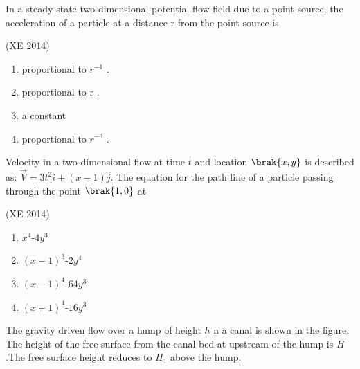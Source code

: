 \item In a steady state two-dimensional potential flow field due to a point source, the acceleration of a
particle at a distance r from the point source is

\hfill{(XE 2014)}
\begin{multicols}{4}
\begin{enumerate}

\item proportional to $r^{-1}$ .
\item proportional to r .
\item a constant
\item proportional to $r^{-3}$ .

\end{enumerate}
\end{multicols}


\item Velocity in a two-dimensional flow at time $t$ and location $\brak{x,y}$ is described as:
$\vec{V}=3t^{2}\hat{i}+(x-1)\hat{j}$. The equation for the path line of a particle passing through the point $\brak{1,0}$ at

\hfill{(XE 2014)}
\begin{multicols}{4}
\begin{enumerate}

\item $x^{4}$-$4y^{3}$
\item $(x-1)^{3}$-$2y^{4}$
\item $(x-1)^{4}$-$64y^{3}$
\item $(x+1)^{4}$-$16y^{3}$

\end{enumerate}
\end{multicols}



\item The gravity driven flow over a hump of height $h$ n a canal is shown in the figure. The height of
the free surface from the canal bed at upstream of the hump is $H$.The free surface height reduces
to $H_1$ above the hump.

